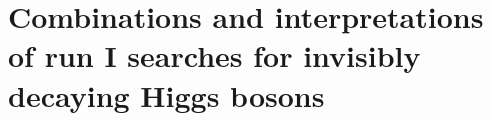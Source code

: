 \chapter{Combinations and interpretations of run I searches for invisibly decaying Higgs bosons}
\label{chap:comb}

